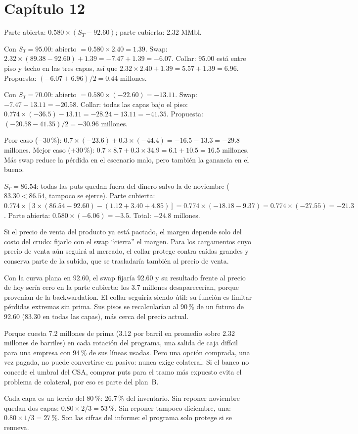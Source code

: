 \section*{Capítulo 12}

 Parte abierta: $0.580\times(S_T-92.60)$; parte cubierta: 2.32 MMbl.

Con $S_T=95.00$: abierto $=0.580\times2.40=1.39$. Swap: $2.32\times(89.38-92.60)+1.39=-7.47+1.39=-6.07$. Collar: 95.00 está entre piso y techo en las tres capas, así que $2.32\times2.40+1.39=5.57+1.39=6.96$. Propuesta: $(-6.07+6.96)/2=0.44$ millones.

Con $S_T=70.00$: abierto $=0.580\times(-22.60)=-13.11$. Swap: $-7.47-13.11=-20.58$. Collar: todas las capas bajo el piso: $0.774\times(-36.5)-13.11=-28.24-13.11=-41.35$. Propuesta: $(-20.58-41.35)/2=-30.96$ millones.

 Peor caso ($-30\,\%$): $0.7\times(-23.6)+0.3\times(-44.4)=-16.5-13.3=-29.8$ millones. Mejor caso ($+30\,\%$): $0.7\times8.7+0.3\times34.9=6.1+10.5=16.5$ millones. Más swap reduce la pérdida en el escenario malo, pero también la ganancia en el bueno.

 $S_T=86.54$: todas las puts quedan fuera del dinero salvo la de noviembre ($83.30<86.54$, tampoco se ejerce). Parte cubierta: $0.774\times[3\times(86.54-92.60)-(1.12+3.40+4.85)]=0.774\times(-18.18-9.37)=0.774\times(-27.55)=-21.3$. Parte abierta: $0.580\times(-6.06)=-3.5$. Total: $-24.8$ millones.

 Si el precio de venta del producto ya está pactado, el margen depende solo del costo del crudo: fijarlo con el swap \enquote{cierra} el margen. Para los cargamentos cuyo precio de venta aún seguirá al mercado, el collar protege contra caídas grandes y conserva parte de la subida, que se trasladaría también al precio de venta.

 Con la curva plana en 92.60, el swap fijaría 92.60 y su resultado frente al precio de hoy sería cero en la parte cubierta: los 3.7 millones desaparecerían, porque provenían de la backwardation. El collar seguiría siendo útil: su función es limitar pérdidas extremas sin prima. Sus pisos se recalcularían al 90\,\% de un futuro de 92.60 (83.30 en todas las capas), más cerca del precio actual.

 Porque cuesta 7.2 millones de prima (3.12 por barril en promedio sobre 2.32 millones de barriles) en cada rotación del programa, una salida de caja difícil para una empresa con 94\,\% de sus líneas usadas. Pero una opción comprada, una vez pagada, no puede convertirse en pasivo: nunca exige colateral. Si el banco no concede el umbral del CSA, comprar puts para el tramo más expuesto evita el problema de colateral, por eso es parte del plan~B.

 Cada capa es un tercio del 80\,\%: 26.7\,\% del inventario. Sin reponer noviembre quedan dos capas: $0.80\times2/3=53\,\%$. Sin reponer tampoco diciembre, una: $0.80\times1/3=27\,\%$. Son las cifras del informe: el programa solo protege si se renueva.
